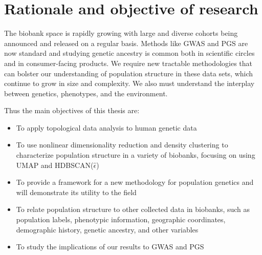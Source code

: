 



\section{Rationale and objective of research}

The biobank space is rapidly growing with large and diverse cohorts being announced and released on a regular basis. Methods like GWAS and PGS are now standard and studying genetic ancestry is common both in scientific circles and in consumer-facing products. We require new tractable methodologies that can bolster our understanding of population structure in these data sets, which continue to grow in size and complexity. We also must understand the interplay between genetics, phenotypes, and the environment. 

Thus the main objectives of this thesis are:
\begin{itemize}
\item To apply topological data analysis to human genetic data
\item To use nonlinear dimensionality reduction and density clustering to characterize population structure in a variety of biobanks, focusing on using UMAP and HDBSCAN($\hat{\epsilon}$)
\item To provide a framework for a new methodology for population genetics and will demonstrate its utility to the field
\item To relate population structure to other collected data in biobanks, such as population labels, phenotypic information, geographic coordinates, demographic history, genetic ancestry, and other variables
\item To study the implications of our results to GWAS and PGS
\end{itemize}

\clearpage